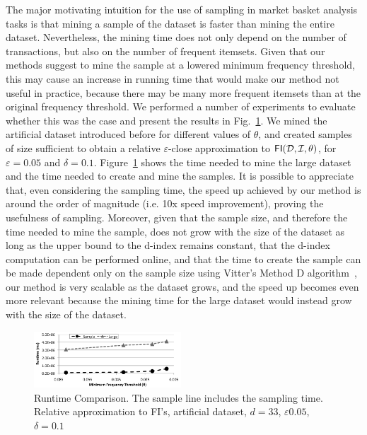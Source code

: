The major motivating intuition for the use of sampling in market basket analysis
tasks is that mining a sample of the dataset is faster than mining the entire
dataset. Nevertheless, the mining time does not only depend on the number of
transactions, but also on the number of frequent itemsets. Given that our
methods suggest to mine the sample at a lowered minimum frequency threshold,
this may cause an increase in running time that would make our method not useful
in practice, because there may be many more frequent itemsets than at the
original frequency threshold. We performed a number of experiments to evaluate
whether this was the case and present the results in Fig.~\ref{fig:runtime}. 
We mined the artificial dataset introduced before for different values of $\theta$,
and created samples of size sufficient to obtain a relative $\varepsilon$-close
approximation to $\mathsf{FI}({\cal D},{\cal I},\theta)$, for $\varepsilon=0.05$ and
$\delta=0.1$. Figure~\ref{fig:runtime} shows the time needed to mine the large
dataset and the time needed to create and mine the samples. It is possible to
appreciate that, even considering the sampling time, the speed up achieved by
our method is around the order of magnitude (i.e. 10x speed improvement),
proving the usefulness of sampling. Moreover, given that the sample size, and
therefore the time needed to mine the sample, does not grow with the size of the
dataset as long as the upper bound to the d-index remains constant, that the
d-index computation can be performed online, and that the time to create the
sample can be made dependent only on the sample size using Vitter's Method D
algorithm~\citep{Vitter87}, our method is very scalable as the dataset grows, and
the speed up becomes even more relevant because the mining time for the large
dataset would instead grow with the size of the dataset.

\begin{figure}[tp]
  \centering
  \includegraphics[width=0.49\textwidth]{vcmine/Fig3}
  \caption{Runtime Comparison. The sample line includes the sampling time.
  Relative approximation to FI's, artificial dataset, $d=33$, $\varepsilon0.05$,
  $\delta=0.1$}
  \label{fig:runtime}
\end{figure}

